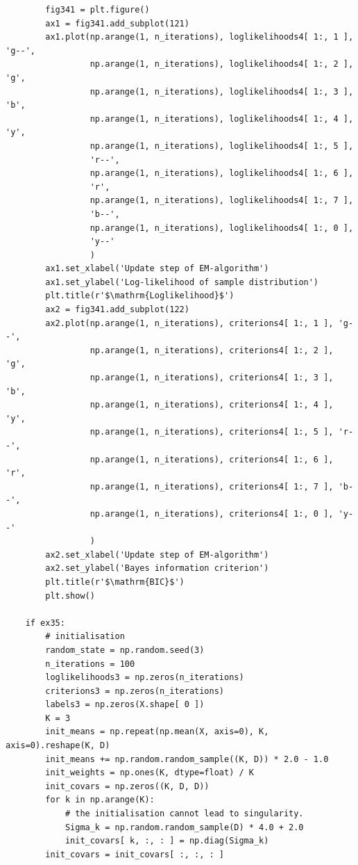 \begin{verbatim}
        fig341 = plt.figure()
        ax1 = fig341.add_subplot(121)
        ax1.plot(np.arange(1, n_iterations), loglikelihoods4[ 1:, 1 ], 'g--',
                 np.arange(1, n_iterations), loglikelihoods4[ 1:, 2 ], 'g',
                 np.arange(1, n_iterations), loglikelihoods4[ 1:, 3 ], 'b',
                 np.arange(1, n_iterations), loglikelihoods4[ 1:, 4 ], 'y',
                 np.arange(1, n_iterations), loglikelihoods4[ 1:, 5 ],
                 'r--',
                 np.arange(1, n_iterations), loglikelihoods4[ 1:, 6 ],
                 'r',
                 np.arange(1, n_iterations), loglikelihoods4[ 1:, 7 ],
                 'b--',
                 np.arange(1, n_iterations), loglikelihoods4[ 1:, 0 ],
                 'y--'
                 )
        ax1.set_xlabel('Update step of EM-algorithm')
        ax1.set_ylabel('Log-likelihood of sample distribution')
        plt.title(r'$\mathrm{Loglikelihood}$')
        ax2 = fig341.add_subplot(122)
        ax2.plot(np.arange(1, n_iterations), criterions4[ 1:, 1 ], 'g--',
                 np.arange(1, n_iterations), criterions4[ 1:, 2 ], 'g',
                 np.arange(1, n_iterations), criterions4[ 1:, 3 ], 'b',
                 np.arange(1, n_iterations), criterions4[ 1:, 4 ], 'y',
                 np.arange(1, n_iterations), criterions4[ 1:, 5 ], 'r--',
                 np.arange(1, n_iterations), criterions4[ 1:, 6 ], 'r',
                 np.arange(1, n_iterations), criterions4[ 1:, 7 ], 'b--',
                 np.arange(1, n_iterations), criterions4[ 1:, 0 ], 'y--'
                 )
        ax2.set_xlabel('Update step of EM-algorithm')
        ax2.set_ylabel('Bayes information criterion')
        plt.title(r'$\mathrm{BIC}$')
        plt.show()

    if ex35:
        # initialisation
        random_state = np.random.seed(3)
        n_iterations = 100
        loglikelihoods3 = np.zeros(n_iterations)
        criterions3 = np.zeros(n_iterations)
        labels3 = np.zeros(X.shape[ 0 ])
        K = 3
        init_means = np.repeat(np.mean(X, axis=0), K, axis=0).reshape(K, D)
        init_means += np.random.random_sample((K, D)) * 2.0 - 1.0
        init_weights = np.ones(K, dtype=float) / K
        init_covars = np.zeros((K, D, D))
        for k in np.arange(K):
            # the initialisation cannot lead to singularity.
            Sigma_k = np.random.random_sample(D) * 4.0 + 2.0
            init_covars[ k, :, : ] = np.diag(Sigma_k)
        init_covars = init_covars[ :, :, : ]
        

\end{verbatim}
